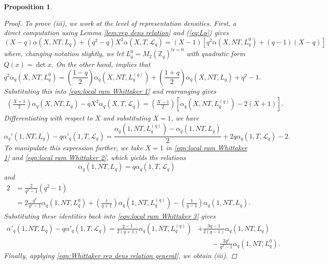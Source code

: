 \documentclass[reqno,oneside]{amsart}
\theoremstyle{plain}
\newtheorem{proposition}[theorem]{Proposition}
\theoremstyle{remark}
\numberwithin{theorem}{section}
\newcommand{\calL}{\mathcal L}
\newcommand{\Z}{\mathbb{Z}}
\begin{document}
\begin{proposition}
\begin{proof}
			To prove \textit{(iii)}, we  work at the level of representation densities. First, a direct computation using  Lemma \ref{lem:rep dens relation} and (\ref{eq:Lp}) gives
			\begin{equation}  \label{eqn:local ram Whittaker 1}
			(X-q) \alpha(X, NT, L_q) + (q^2-q) X^2 \alpha(X, T, \calL_q)
			= (X-1) \left[ q^2 \alpha(X, NT, L^0_{q}) + (q-1) (X-q)\right]
			\end{equation}
			where, changing notation slightly, we let $L^0_{q} = M_2(\Z_q)^{\mathrm{tr} =0}$ with quadratic form
			$Q(x) =\det x$. On the other hand, \cite[Corollary 8.4]{YangLocal} implies that
			\begin{equation} \label{eqn:local ram Whittaker 2}
			q^2 \alpha_q(X, NT, L^0_q) = \left( \frac{1-q}2 \right)\alpha_q(X, NT, L^{(q)}_q)  + \left( \frac{1+q}2 \right)\alpha_q(X, NT, L_q)+ q^2 - 1.
			\end{equation}
			Substituting this into \eqref{eqn:local ram Whittaker 1} and rearranging gives
			\begin{align}
			\left( \frac{X+1}2 \right) \alpha_q(X, NT, L_q) - qX^2\alpha_q(X, T, \calL_q) = \left( \frac{X-1}2 \right) \left[ \alpha_q(X, NT, L_q^{(q)}) - 2(X+1) \right] .
			\end{align}
			Differentiating with respect to $X$ and substituting $X=1$, we have
			\begin{equation} \label{eqn:local ram Whittaker 3}
			\alpha_q'(1, NT, L_q) - q \alpha'_q(1, T,  \calL_q)
			= \frac{ \alpha_q(1, NT, L_q^{(q)}) - \alpha_q(1, NT, L_q)}{2} +2q \alpha_q(1, T, \calL_q) - 2.
			\end{equation}
			To manipulate this expression further, we take $X =1 $ in \eqref{eqn:local ram Whittaker 1} and \eqref{eqn:local ram Whittaker 2}, which yields the relations
			\begin{equation}
			\alpha_q(1, NT, L_q ) = q \alpha_q(1, T, \calL_q)
			\end{equation}
			and
			\begin{align}
			2 &= \frac{2}{q^2-1}	(q^2 -1)   \\
			&= 2 \frac{q^2}{q^2-1} \alpha_q(1, NT, L_q^0)  + \left( \frac{1}{q+1} \right)\alpha_q(1, NT, L^{(q)}_q)  - \left( \frac{1}{q-1} \right)\alpha_q(1, NT, L_q).
			\end{align}
			Substituting these identities back into \eqref{eqn:local ram Whittaker 3} gives
			\begin{align}
			\alpha'_q(1, NT, L_q) - q \alpha'_q(1, T, \calL_q) = \frac{q-1}{2(q+1)}\alpha_q(1, NT, L_{q}^{(q)}) &+ \frac{3q - 1}{2(q-1)} \alpha_q(1, NT, L_q)  \\
			& \qquad	- \frac{2q^2}{q^2-1} \alpha_q(1, NT, L_q^0).
			\end{align}
			Finally, applying \eqref{eqn:Whittaker rep dens relation general}, we obtain  \textit{(iii)}.
			

\end{proof}
\end{proposition}
\end{document}
